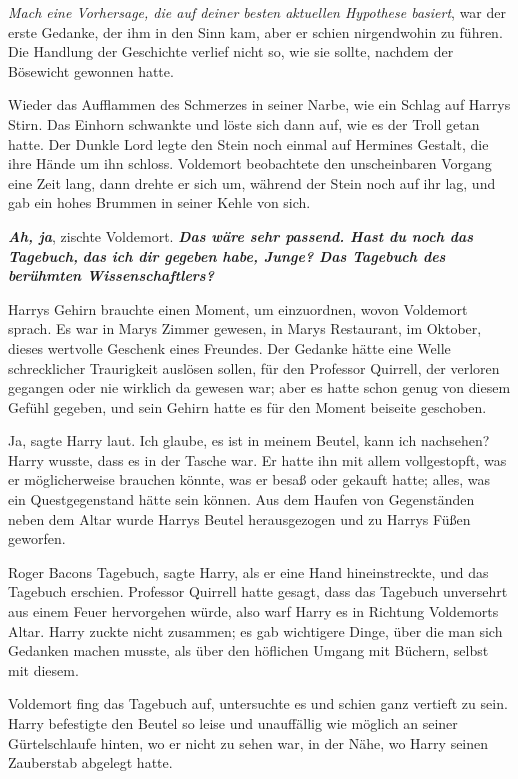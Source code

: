 \emph{Mach eine Vorhersage, die auf deiner besten aktuellen Hypothese basiert},
war der erste Gedanke, der ihm in den Sinn kam, aber er schien nirgendwohin zu
führen. Die Handlung der Geschichte verlief nicht so, wie sie sollte, nachdem
der Bösewicht gewonnen hatte.

Wieder das Aufflammen des Schmerzes in seiner Narbe, wie ein Schlag auf Harrys
Stirn. Das Einhorn schwankte und löste sich dann auf, wie es der Troll getan
hatte. Der Dunkle Lord legte den Stein noch einmal auf Hermines Gestalt, die
ihre Hände um ihn schloss. Voldemort beobachtete den unscheinbaren Vorgang eine
Zeit lang, dann drehte er sich um, während der Stein noch auf ihr lag, und gab
ein hohes Brummen in seiner Kehle von sich.

\glqq{}\textbf{\emph{Ah, ja}}\grqq{}, zischte Voldemort. \glqq{}\textbf{\emph{Das
wäre sehr passend. Hast du noch das Tagebuch,} }\textbf{\emph{das ich dir
gegeben habe, Junge? Das Tagebuch des berühmten Wissenschaftlers?}}\grqq{}

Harrys Gehirn brauchte einen Moment, um einzuordnen, wovon Voldemort sprach. Es
war in Marys Zimmer gewesen, in Marys Restaurant, im Oktober, dieses wertvolle
Geschenk eines Freundes. Der Gedanke hätte eine Welle schrecklicher Traurigkeit
auslösen sollen, für den Professor Quirrell, der verloren gegangen oder nie
wirklich da gewesen war; aber es hatte schon genug von diesem Gefühl gegeben,
und sein Gehirn hatte es für den Moment beiseite geschoben.

\glqq{}Ja\grqq{}, sagte Harry laut. \glqq{}Ich glaube, es ist in meinem Beutel,
kann ich nachsehen?\grqq{} Harry wusste, dass es in der Tasche war. Er hatte ihn mit
allem vollgestopft, was er möglicherweise brauchen könnte, was er besaß oder
gekauft hatte; alles, was ein Questgegenstand hätte sein können. Aus dem Haufen
von Gegenständen neben dem Altar wurde Harrys Beutel herausgezogen und zu Harrys
Füßen geworfen.

\glqq{}Roger Bacons Tagebuch\grqq{}, sagte Harry, als er eine Hand
hineinstreckte, und das Tagebuch erschien. Professor Quirrell hatte gesagt, dass
das Tagebuch unversehrt aus einem Feuer hervorgehen würde, also warf Harry es in
Richtung Voldemorts Altar. Harry zuckte nicht zusammen; es gab wichtigere Dinge,
über die man sich Gedanken machen musste, als über den höflichen Umgang mit
Büchern, selbst mit diesem.

Voldemort fing das Tagebuch auf, untersuchte es und schien ganz vertieft zu
sein. Harry befestigte den Beutel so leise und unauffällig wie möglich an seiner
Gürtelschlaufe hinten, wo er nicht zu sehen war, in der Nähe, wo Harry seinen
Zauberstab abgelegt hatte.

